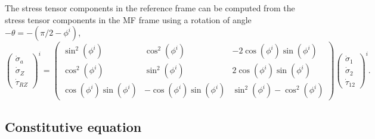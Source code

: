 \documentclass[]{article}
\begin{document}
The stress tensor components in the reference frame can be computed from the stress tensor components in the MF frame using a rotation of angle $-\theta=-(\pi/2-\phi^i)$,
\begin{equation}
	\boxed{
	\left(\begin{matrix}
		\dot{\sigma}_a\\
		\dot{\sigma}_Z\\
		\dot{\tau}_{RZ}
	\end{matrix}\right)^i
	=
	\left(\begin{matrix}
		\sin^2(\phi^i) & \cos^2(\phi^i) & -2\cos(\phi^i)\sin(\phi^i)\\
		\cos^2(\phi^i) & \sin^2(\phi^i) & 2\cos(\phi^i)\sin(\phi^i)\\
		\cos(\phi^i)\sin(\phi^i) & -\cos(\phi^i)\sin(\phi^i) & \sin^2(\phi^i)-\cos^2(\phi^i)
	\end{matrix}\right)
	\left(\begin{matrix}
	\dot{\sigma}_1\\
	\dot{\sigma}_2\\
	\dot{\tau}_{12}
\end{matrix}\right)^i}.
\end{equation}
\subsection{Constitutive equation}
\end{document}
